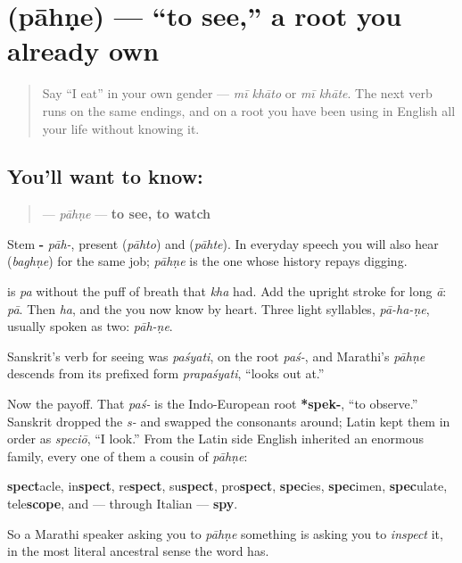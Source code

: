 \section[pāhṇe]{ (pāhṇe) — \textquotedblleft{}to see,\textquotedblright{} a root you already own}

\label{lesson:MR-C07-pahne}



\begin{quote}
Say \textquotedblleft{}I eat\textquotedblright{} in your own gender — \emph{mī khāto} or \emph{mī khāte}. The next verb runs on the same endings, and on a root you have been using in English all your life without knowing it.
\end{quote}

\subsection*{You'll want to know: }
\begin{quote}
\textbf{} — \emph{pāhṇe} — \textbf{to see, to watch}
\end{quote}

Stem \textbf{-} \emph{pāh-}, present \textbf{} (\emph{pāhto}) and \textbf{} (\emph{pāhte}). In everyday speech you will also hear \textbf{} (\emph{baghṇe}) for the same job; \emph{pāhṇe} is the one whose history repays digging.

\begin{sounds}
\textbf{} is \emph{pa} without the puff of breath that \emph{kha} had. Add the upright stroke for long \emph{ā}: \textbf{} \emph{pā}. Then \textbf{} \emph{ha}, and the \textbf{} you now know by heart. Three light syllables, \emph{pā-ha-ṇe}, usually spoken as two: \emph{pāh-ṇe}.
\end{sounds}

\begin{cousinweb}
Sanskrit's verb for seeing was \textbf{} \emph{paśyati}, on the root \emph{paś-}, and Marathi's \emph{pāhṇe} descends from its prefixed form \textbf{} \emph{prapaśyati}, \textquotedblleft{}looks out at.\textquotedblright{}

Now the payoff. That \emph{paś-} is the Indo-European root \textbf{*spek-}, \textquotedblleft{}to observe.\textquotedblright{} Sanskrit dropped the \emph{s-} and swapped the consonants around; Latin kept them in order as \emph{speciō}, \textquotedblleft{}I look.\textquotedblright{} From the Latin side English inherited an enormous family, every one of them a cousin of \emph{pāhṇe}:

\textbf{spect}acle, in\textbf{spect}, re\textbf{spect}, su\textbf{spect}, pro\textbf{spect}, \textbf{spec}ies, \textbf{spec}imen, \textbf{spec}ulate, tele\textbf{scope}, and — through Italian — \textbf{spy}.

So a Marathi speaker asking you to \emph{pāhṇe} something is asking you to \emph{inspect} it, in the most literal ancestral sense the word has.
\end{cousinweb}

